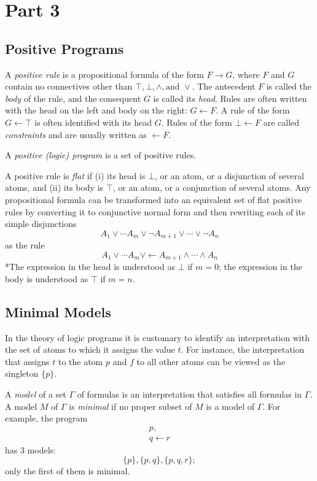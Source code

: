 \section{Part 3}
\subsection{Positive Programs}
A \textit{positive rule} is a propositional formula of the form $F \rightarrow G$, where $F$ and $G$ contain no connectives other than $\top, \bot, \wedge, \text{and } \vee$. The antecedent $F$ is called the \textit{body} of the rule, and the consequent $G$ is called its \textit{head}. Rules are often written with the head on the left and body on the right: $G \leftarrow F$. A rule of the form $G \leftarrow \top$ is often identified with its head $G$. Rules of the form $\bot \leftarrow F$ are called \textit{constraints} and are usually written as $\leftarrow F$. 

A \textit{positive (logic) program} is a set of positive rules. 

A positive rule is \textit{flat} if (i) its head is $\bot$, or an atom, or a disjunction of several atoms, and (ii) its body is $\top$, or an atom, or a conjunction of several atoms. Any propositional formula can be transformed into an equivalent set of flat positive rules by converting it to conjunctive normal form and then rewriting each of its simple disjunctions
\begin{equation*}
A_1 \vee \cdots A_m \vee \neg A_{m + 1} \vee \cdots \vee \neg A_n
\end{equation*}
as the rule
\begin{equation*}
A_1 \vee \cdots A_m \vee \leftarrow A_{m + 1} \wedge \cdots \wedge A_n
\end{equation*}
*The expression in the head is understood as $\bot$ if $m = 0$; the expression in the body is understood as $\top$ if $m = n$. 

\subsection{Minimal Models}
In the theory of logic programs it is customary to identify an interpretation with the set of atoms to which it assigns the value $t$. For instance, the interpretation that assigns $t$ to the atom $p$ and $f$ to all other atoms can be viewed as the singleton $\{p\}$. 

A \textit{model} of a set $\Gamma$ of formulas is an interpretation that satisfies all formulas in $\Gamma$. A model $M$ of $\Gamma$ is \textit{minimal} if no proper subset of $M$ is a model of $\Gamma$. For example, the program
\begin{equation}
\begin{gathered}
p, \\
q \leftarrow r
\end{gathered}
\end{equation}
has 3 models:
\begin{equation*}
 \{p\}, \{p, q\}, \{p, q, r\};
\end{equation*}
only the first of them is minimal. 

